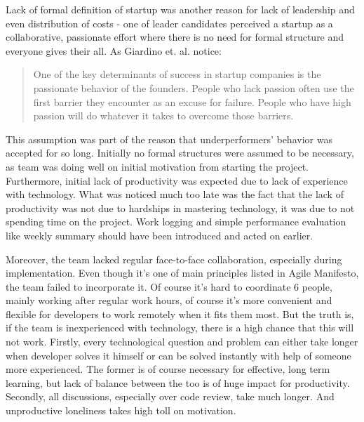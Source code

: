 \documentclass{article}
\begin{document}
Lack of formal definition of startup \cite{paternoster2014software} was another reason for lack of leadership and even distribution of costs - one of leader candidates perceived a startup as a collaborative, passionate effort where there is no need for formal structure and everyone gives their all. As Giardino et. al. \cite{giardino2014early} notice:
\begin{quote}
  One of the key determinants of success in startup companies is the passionate behavior of the founders. People who lack passion often use the first barrier they encounter as an excuse for failure. People who have high passion will do whatever it takes to overcome those barriers.
\end{quote}

This assumption was part of the reason that underperformers' behavior was accepted for so long. Initially no formal structures were assumed to be necessary, as team was doing well on initial motivation from starting the project. Furthermore, initial lack of productivity was expected due to lack of experience with technology. What was noticed much too late was the fact that the lack of productivity was not due to hardships in mastering technology, it was due to not spending time on the project. Work logging and simple performance evaluation like weekly summary should have been introduced and acted on earlier.

Moreover, the team lacked regular face-to-face collaboration, especially during implementation. Even though it's one of main principles listed in Agile Manifesto, the team failed to incorporate it. Of course it's hard to coordinate 6 people, mainly working after regular work hours, of course it's more convenient and flexible for developers to work remotely when it fits them most. But the truth is, if the team is inexperienced with technology, there is a high chance that this will not work. Firstly, every technological question and problem can either take longer when developer solves it himself or can be solved instantly with help of someone more experienced. The former is of course necessary for effective, long term learning, but lack of balance between the too is of huge impact for productivity. Secondly, all discussions, especially over code review, take much longer. And unproductive loneliness takes high toll on motivation.
\end{document}
